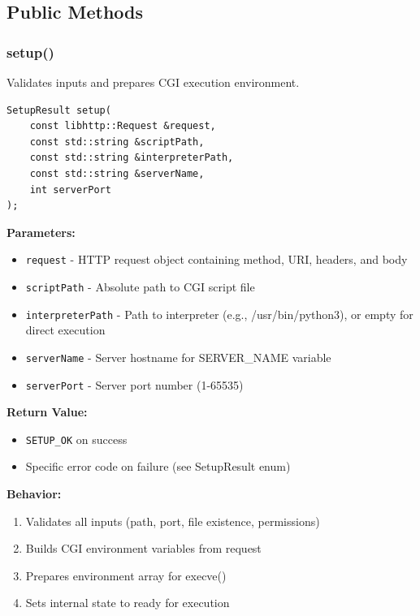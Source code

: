 \documentclass[11pt,a4paper]{article}
\begin{document}
\subsection{Public Methods}

\subsubsection{setup()}

Validates inputs and prepares CGI execution environment.

\begin{lstlisting}[caption=setup() Method]
SetupResult setup(
    const libhttp::Request &request,
    const std::string &scriptPath,
    const std::string &interpreterPath,
    const std::string &serverName,
    int serverPort
);
\end{lstlisting}

\textbf{Parameters:}
\begin{itemize}
    \item \texttt{request} - HTTP request object containing method, URI, headers, and body
    \item \texttt{scriptPath} - Absolute path to CGI script file
    \item \texttt{interpreterPath} - Path to interpreter (e.g., /usr/bin/python3), or empty for direct execution
    \item \texttt{serverName} - Server hostname for SERVER\_NAME variable
    \item \texttt{serverPort} - Server port number (1-65535)
\end{itemize}

\textbf{Return Value:}
\begin{itemize}
    \item \texttt{SETUP\_OK} on success
    \item Specific error code on failure (see SetupResult enum)
\end{itemize}

\textbf{Behavior:}
\begin{enumerate}
    \item Validates all inputs (path, port, file existence, permissions)
    \item Builds CGI environment variables from request
    \item Prepares environment array for execve()
    \item Sets internal state to ready for execution
\end{enumerate}
\end{document}
